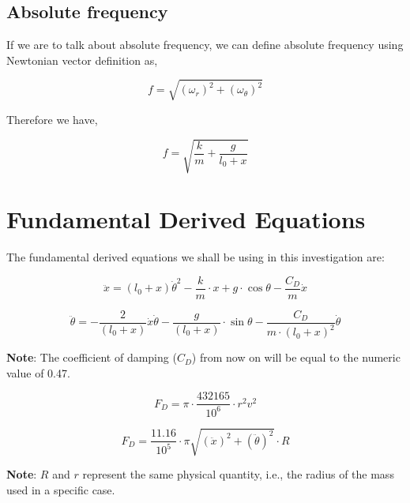     \subsection{{Absolute frequency}}
                
        {If we are to talk about absolute frequency, we can define absolute frequency using Newtonian vector definition as,}
                
            $$f = \sqrt{\left(\omega_r\right)^2 + \left(\omega_\theta\right)^2}$$
                
        {Therefore we have,}
                
            $$f = \sqrt{\frac{k}{m} + \frac{g}{l_0 + x}}$$



\section{{Fundamental Derived Equations}}
{The fundamental derived equations we shall be using in this investigation are:}
            
    \begin{equation}
        \ddot{x} = (l_0+x)\dot{\theta}^2 - \frac{k}{m}\cdot x + g\cdot\cos{\theta} - \frac{C_D}{m}\dot{x}
        \label{eq1}
    \end{equation}
            
    \begin{equation}
        \ddot{\theta} = - \frac{2}{(l_0+x)}\dot{x}\dot{\theta} - \frac{g}{(l_0+x)}\cdot\sin{\theta} - \frac{C_D}{m\cdot(l_0+x)^2}\dot{\theta}
    \label{eq2}
    \end{equation}
            
        {\textbf{Note}: The coefficient of damping ($C_D$) from now on will be equal to the numeric value of 0.47.}
            
    \begin{equation}
        F_D = \pi\cdot\frac{432165}{10^{6}}\cdot r^2v^2
        \label{eq3}
    \end{equation}
            
    \begin{equation}
        F_D = \frac{11.16}{10^{5}}\cdot\pi\sqrt{(\ddot{x})^2 + (\ddot{\theta})^2}\cdot R
        \label{eq4}
    \end{equation}
            
        {\textbf{Note}: $R$ and $r$ represent the same physical quantity, i.e., the radius of the mass used in a specific case.}
            
